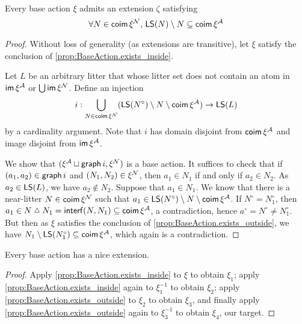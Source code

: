 \begin{proposition}
  \label{prop:BaseAction.exists_outside}
  Every base action \( \xi \) admits an extension \( \zeta \) satisfying
  \[ \forall N \in \operatorname{\mathsf{coim}} \xi^{\mathcal N},\, \operatorname{\mathsf{LS}}(N) \setminus N \subseteq \operatorname{\mathsf{coim}} \xi^{\mathcal A} \]
\end{proposition}
\begin{proof}
  Without loss of generality (as extensions are transitive), let \( \xi \) satisfy the conclusion of \cref{prop:BaseAction.exists_inside}.

  Let \( L \) be an arbitrary litter that whose litter set does not contain an atom in \( \operatorname{\mathsf{im}} \xi^{\mathcal A} \) or \( \bigcup \operatorname{\mathsf{im}} \xi^{\mathcal N} \).
  Define an injection
  \[ i : \bigcup_{N \in \operatorname{\mathsf{coim}} \xi^{\mathcal N}} (\operatorname{\mathsf{LS}}(N^\circ) \setminus N \setminus \operatorname{\mathsf{coim}} \xi^{\mathcal A}) \to \operatorname{\mathsf{LS}}(L) \]
  by a cardinality argument.
  Note that \( i \) has domain disjoint from \( \operatorname{\mathsf{coim}} \xi^{\mathcal A} \) and image disjoint from \( \operatorname{\mathsf{im}} \xi^{\mathcal A} \).

  We show that \( (\xi^{\mathcal A} \sqcup \operatorname{\mathsf{graph}} i, \xi^{\mathcal N}) \) is a base action.
  It suffices to check that if \( (a_1, a_2) \in \operatorname{\mathsf{graph}} i \) and \( (N_1, N_2) \in \xi^{\mathcal N} \), then \( a_1 \in N_1 \) if and only if \( a_2 \in N_2 \).
  As \( a_2 \in \operatorname{\mathsf{LS}}(L) \), we have \( a_2 \notin N_2 \).
  Suppose that \( a_1 \in N_1 \).
  We know that there is a near-litter \( N \in \operatorname{\mathsf{coim}} \xi^{\mathcal N} \) such that \( a_1 \in \operatorname{\mathsf{LS}}(N^\circ) \setminus N \setminus \operatorname{\mathsf{coim}} \xi^{\mathcal A} \).
  If \( N^\circ = N_1^\circ \), then \( a_1 \in N \symmdiff N_1 = \interf(N, N_1) \subseteq \coim \xi^\Atom \), a contradiction, hence \( a^\circ = N^\circ \neq N_1^\circ \).
  But then as \( \xi \) satisfies the conclusion of \cref{prop:BaseAction.exists_outside}, we have \( N_1 \setminus \operatorname{\mathsf{LS}}(N_1^\circ) \subseteq \operatorname{\mathsf{coim}} \xi^{\mathcal A} \), which again is a contradiction.
\end{proof}
\begin{proposition}
  \label{prop:BaseAction.exists_nice}
  Every base action has a nice extension.
\end{proposition}
\begin{proof}
  Apply \cref{prop:BaseAction.exists_inside} to \( \xi \) to obtain \( \xi_1 \); apply \cref{prop:BaseAction.exists_inside} again to \( \xi_1^{-1} \) to obtain \( \xi_2 \); apply \cref{prop:BaseAction.exists_outside} to \( \xi_2 \) to obtain \( \xi_3 \), and finally apply \cref{prop:BaseAction.exists_outside} again to \( \xi_3^{-1} \) to obtain \( \xi_4 \), our target.
\end{proof}

